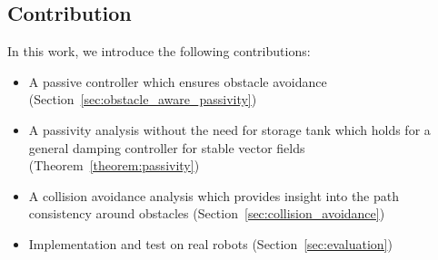 \subsection{Contribution}
In this work, we introduce the following contributions:
\begin{itemize}
\item A passive controller which ensures obstacle avoidance (Section~\ref{sec:obstacle_aware_passivity})
\item A passivity analysis without the need for storage tank which holds for a general damping controller for stable vector fields (Theorem~\ref{theorem:passivity})
\item A collision avoidance analysis which provides insight into the path consistency around obstacles (Section~\ref{sec:collision_avoidance})
\item Implementation and test on real robots (Section~\ref{sec:evaluation})
\end{itemize}
